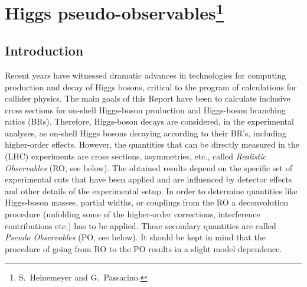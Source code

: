 \newcommand{\appendx}[1]{Appendix~\ref{#1}}
\newcommand{\hsp}{\hspace{.5mm}}
\def\negs{\hspace{-0.26in}}
\def\negsh{\hspace{-0.13in}}
\newcommand{\barq}{\overline q}
\newcommand{\barb}{\overline b}
\newcommand{\bmid}{\Bigr|}
\newcommand{\htr}[1]{{\color{red} #1}}
\newcommand{\htb}[1]{{\color{blue} #1}}
\newcommand{\htg}[1]{{\color{green} #1}}
\newcommand{\hto}[1]{{\color{Orange}  #1}}
\newcommand{\htp}[1]{{\color{purple}  #1}}
\newcommand{\lbl}[1]{\color{Lightblue}#1\color{Lightblue}}
\providecommand{\lsim}
{\;\raisebox{-.3em}{$\stackrel{\displaystyle <}{\sim}$}\;}
\providecommand{\gsim}
{\;\raisebox{-.3em}{$\stackrel{\displaystyle >}{\sim}$}\;}
\section{Higgs pseudo-observables\footnote{S.~Heinemeyer and G.~Passarino.}}
\subsection{Introduction}
Recent years have witnessed dramatic advances in technologies for computing
production and decay of Higgs bosons, critical to the program of calculations
for collider physics.
The main goals of this Report have been to calculate inclusive cross sections 
for on-shell Higgs-boson production and Higgs-boson branching ratios (BRs). 
Therefore, Higgs-boson decays are considered, in the experimental analyses, 
as on-shell Higgs bosons decaying according to their BR's, including 
higher-order effects.
However, the quantities that can be directly measured in the (LHC)
experiments are cross sections, asymmetries, etc., called {\em Realistic
Observables} (RO, see below).
The obtained results depend on the specific set of experimental cuts that have
been applied and are influenced by detector effects and other details
of the experimental setup. In order to determine quantities like Higgs-boson
masses, partial widths, or couplings from the RO a deconvolution
procedure (unfolding some of the higher-order corrections, interference
contributions etc.) has to be applied. These secondary quantities are called
{\em Pseudo Observables} (PO, see below).
It should be kept in mind that the procedure of going from RO to the
PO results in a slight model dependence. 

